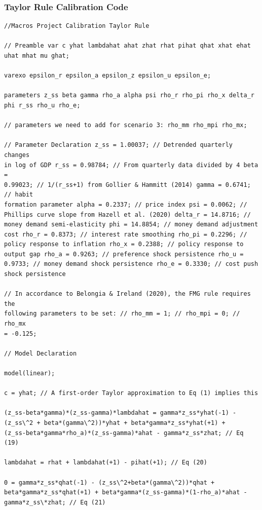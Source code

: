 \documentclass[11pt,preprint, authoryear]{elsarticle}
\numberwithin{equation}{section}
\numberwithin{figure}{section}
\numberwithin{table}{section}
\begin{document}
\hypertarget{taylor-rule-calibration-code}{%
\subsubsection{Taylor Rule Calibration
Code}\label{taylor-rule-calibration-code}}

\begin{verbatim}
//Macros Project Calibration Taylor Rule

// Preamble var c yhat lambdahat ahat zhat rhat pihat qhat xhat ehat
uhat mhat mu ghat;

varexo epsilon_r epsilon_a epsilon_z epsilon_u epsilon_e;

parameters z_ss beta gamma rho_a alpha psi rho_r rho_pi rho_x delta_r
phi r_ss rho_u rho_e;

// parameters we need to add for scenario 3: rho_mm rho_mpi rho_mx;

// Parameter Declaration z_ss = 1.00037; // Detrended quarterly changes
in log of GDP r_ss = 0.98784; // From quarterly data divided by 4 beta =
0.99023; // 1/(r_ss+1) from Gollier & Hammitt (2014) gamma = 0.6741; // habit
formation parameter alpha = 0.2337; // price index psi = 0.0062; //
Phillips curve slope from Hazell et al. (2020) delta_r = 14.8716; //
money demand semi-elasticity phi = 14.8854; // money demand adjustment
cost rho_r = 0.8373; // interest rate smoothing rho_pi = 0.2296; //
policy response to inflation rho_x = 0.2388; // policy response to
output gap rho_a = 0.9263; // preference shock persistence rho_u =
0.9733; // money demand shock persistence rho_e = 0.3330; // cost push
shock persistence

// In accordance to Belongia & Ireland (2020), the FMG rule requires the
following parameters to be set: // rho_mm = 1; // rho_mpi = 0; // rho_mx
= -0.125;

// Model Declaration

model(linear);

c = yhat; // A first-order Taylor approximation to Eq (1) implies this

(z_ss-beta*gamma)*(z_ss-gamma)*lambdahat = gamma*z_ss*yhat(-1) -
(z_ss\^2 + beta*(gamma\^2))*yhat + beta*gamma*z_ss*yhat(+1) +
(z_ss-beta*gamma*rho_a)*(z_ss-gamma)*ahat - gamma*z_ss*zhat; // Eq (19)

lambdahat = rhat + lambdahat(+1) - pihat(+1); // Eq (20)

0 = gamma*z_ss*qhat(-1) - (z_ss\^2+beta*(gamma\^2))*qhat +
beta*gamma*z_ss*qhat(+1) + beta*gamma*(z_ss-gamma)*(1-rho_a)*ahat -
gamma*z_ss\*zhat; // Eq (21)


\end{verbatim}
\end{document}
